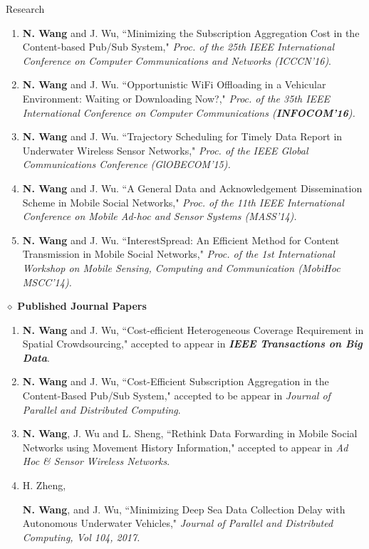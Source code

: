 \documentclass{resume} %
\begin{document}
\begin{rSection}{Research}
\begin{enumerate}[{C}1.]
\item {{\bf N. Wang} and J. Wu, ``{Minimizing the Subscription Aggregation Cost in the Content-based Pub/Sub System},"} \textit{Proc. of the 25th IEEE International Conference on Computer Communications and Networks (ICCCN'16)}.
\item {{\bf N. Wang} and J. Wu. ``{Opportunistic WiFi Offloading in a Vehicular Environment: Waiting or Downloading Now?},"} \textit{Proc. of the 35th IEEE International Conference on Computer Communications ({\bf INFOCOM'16}).} 
\item {{\bf N. Wang} and J. Wu. ``{Trajectory Scheduling for Timely Data Report in Underwater Wireless Sensor Networks},"} \textit{Proc. of the IEEE Global Communications Conference (GlOBECOM'15).} 
\item {{\bf N. Wang} and J. Wu. ``{A General Data and Acknowledgement Dissemination Scheme in Mobile Social Networks},"} \textit{Proc. of the 11th IEEE International Conference on Mobile Ad-hoc and Sensor Systems (MASS'14).} 
\item {{\bf N. Wang} and J. Wu. ``{InterestSpread: An Efficient Method for Content Transmission in Mobile Social Networks},"} \textit{Proc. of the 1st International Workshop on Mobile Sensing, Computing and Communication (MobiHoc MSCC'14).} 
\end{enumerate}

\item $\diamond$ {\bf Published Journal Papers}
\begin{enumerate}[{J}1.] \setlength{\itemsep}{-5pt}
\item {{\bf N. Wang} and J. Wu, ``Cost-efficient Heterogeneous Coverage Requirement in Spatial Crowdsourcing,"} accepted to appear in \textit{{\bf IEEE Transactions on Big Data}}.
\item {{\bf N. Wang} and J. Wu, ``{Cost-Efficient Subscription Aggregation in the Content-Based Pub/Sub System},"} accepted to be appear in \textit{ Journal of Parallel and Distributed Computing}.
\item {{\bf N. Wang}, J. Wu and L. Sheng, ``{Rethink Data Forwarding in Mobile Social Networks using Movement History Information},"} accepted to appear in \textit{Ad Hoc \& Sensor Wireless Networks}.
\item H. Zheng, {{\bf N. Wang}, and J. Wu, ``{Minimizing Deep Sea Data Collection Delay with Autonomous Underwater Vehicles}," \textit{Journal of Parallel and Distributed Computing, Vol 104, 2017.}

}
\end{enumerate}
\end{rSection}
\end{document}
